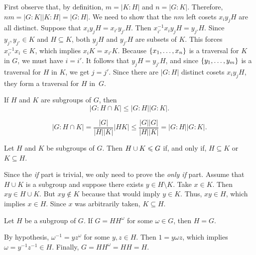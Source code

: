 \begin{solution}
    First observe that, by definition, $m=|K:H|$ and $n=|G:K|$. Therefore, $nm=|G:K||K:H|=|G:H|$. We need to show that the $nm$ left cosets $x_iy_jH$ are all distinct. Suppose that $x_iy_jH = x_{i'}y_{j'}H$. Then $x_{i'}^{-1}x_iy_jH = y_{j'}H$. Since $y_j, y_{j'} \in K$ and $H \subseteq K$, both $y_jH$ and $y_{j'}H$ are subsets of $K$. This forces $x_{i'}^{-1}x_i \in K$, which implies $x_iK = x_{i'}K$. Because $\{x_1, \dots, x_n\}$ is a traversal for $K$ in $G$, we must have $i = i'$. It follows that $y_jH = y_{j'}H$, and since $\{y_1, \dots, y_m\}$ is a traversal for $H$ in $K$, we get $j = j'$. Since there are $|G:H|$ distinct cosets $x_iy_jH$, they form a traversal for $H$ in~$G$.
\end{solution}

\begin{exr}
    If\/ $H$ and\/ $K$ are subgroups of\/ $G$, then
    $$
        |G:H\cap K|\le|G:H||G:K|.
    $$
\end{exr}

\begin{solution}
$$
    |G:H\cap K| = \frac{|G|}{|H||K|}|HK| \le \frac{|G||G|}{|H||K|}=|G:H||G:K|.
$$
 \end{solution}

\begin{exr}\label{exercise-1.1.4}
    Let\/ $H$ and\/ $K$ be subgroups of\/ $G$. Then\/ $H\cup K\leqslant G$ if, and only if,\/ $H\subseteq K$ or\/ $K\subseteq H$. 
\end{exr}

\begin{solution} Since the \textit{if\/} part is trivial, we only need to prove the \textit{only if\/} part. Assume that $H\cup K$ is a subgroup and suppose there exists $y\in H\setminus K$. Take $x\in K$. Then $xy\in H\cup K$. But $xy\notin K$ because that would imply $y\in K$. Thus, $xy\in H$, which implies $x\in H$. Since $x$ was arbitrarily taken, $K\subseteq H$.
\end{solution}

\begin{exr}\label{exercise-1.1.5}
    Let\/ $H$ be a subgroup of\/ $G$. If\/ $G=HH^\omega$ for some\/ $\omega\in G$, then\/ $H=G$.
\end{exr}

\begin{solution} By hypothesis, $\omega^{-1}=yz^\omega$ for some $y,z\in H$. Then $1=y\omega z$, which implies $\omega = y^{-1}z^{-1} \in H$. Finally, $G=HH^\omega=HH=H$.
\end{solution}

